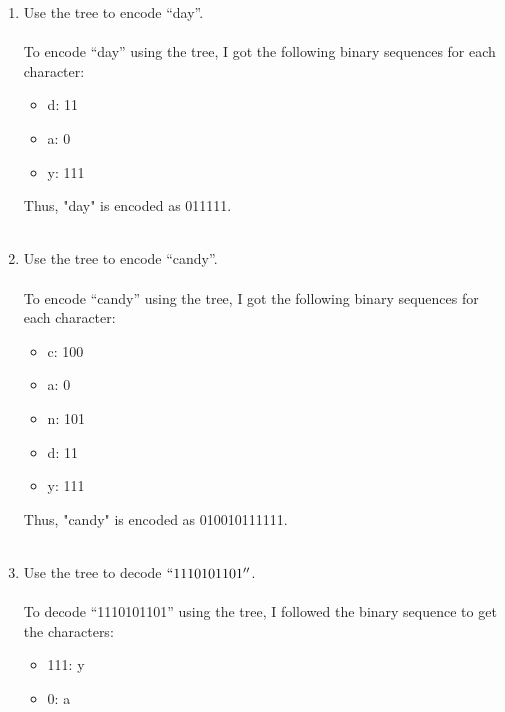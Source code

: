 \documentclass{amsart}
\theoremstyle{definition}
\theoremstyle{Exercise}
\theoremstyle{remark}
\theoremstyle{rule}
\numberwithin{equation}{section}
\begin{document}
\begin{enumerate}[label=(\alph*)]
\item Use the tree to encode ``day''.\\\\
    To encode ``day'' using the tree, I got the following binary sequences for each character:\\
    \begin{itemize}
        \item d: 11\\
        \item a: 0\\
        \item y: 111\\
    \end{itemize}
    Thus, "day" is encoded as 011111.
\\\\
\item Use the tree to encode ``candy''.\\\\
    To encode ``candy'' using the tree, I got the following binary sequences for each character:\\
\begin{itemize}
    \item c: 100\\
    \item a: 0\\
    \item n: 101\\
    \item d: 11\\
    \item y: 111\\
\end{itemize}
    Thus, "candy" is encoded as 010010111111.
\\\\
\item Use the tree to decode $``1110101101''$.\\\\
    To decode ``1110101101'' using the tree, I followed the binary sequence to get the characters:\\
\begin{itemize}
    \item 111: y\\
    \item 0: a\\

\end{itemize}
\end{enumerate}
\end{document}
